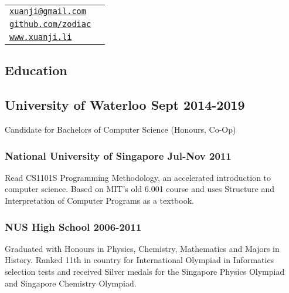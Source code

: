 \documentclass[letterpaper]{article}
\def\name{Li Xuanji}
\begin{document}
\vspace{0.25in}

\begin{minipage}{0.8\linewidth}
\resizebox{0.5\linewidth}{!}{\fontsize{30}{36}\selectfont \name}
\end{minipage}
\begin{minipage}{0.2\linewidth}
  \begin{tabular}{ll}
    \href{mailto:xuanji@gmail.com}{\tt xuanji@gmail.com} \\
    \href{https://github.com/zodiac}{\tt github.com/zodiac} \\
    \href{www.xuanji.li}{\tt www.xuanji.li}
  \end{tabular}
\end{minipage}

\vspace{2em}

\begin{center}
\section*{Education}
\end{center}

\subsection*{University of Waterloo \hfill Sept 2014-2019}
Candidate for Bachelors of Computer Science (Honours, Co-Op)

\subsubsection*{National University of Singapore \hfill Jul-Nov 2011}
Read CS1101S Programming Methodology, an accelerated introduction to computer science. Based on MIT's old 6.001 course and uses Structure and Interpretation of Computer Programs as a textbook.

\subsubsection*{NUS High School \hfill 2006-2011}
Graduated with Honours in Physics, Chemistry, Mathematics and Majors in History. Ranked 11th in country for International Olympiad in Informatics selection tests and received Silver medals for the Singapore Physics Olympiad and Singapore Chemistry Olympiad.


\vspace{1em}
\end{document}
